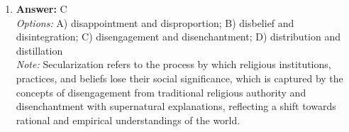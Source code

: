 \documentclass[12pt]{article}
\begin{document}
\begin{enumerate}[label=\arabic*.]
\\ \textit{Note:} The term 'power elite' as introduced by Scott (1991) accurately describes a small group of individuals within a state who hold significant power and influence, primarily originating from a dominant power bloc, thereby reinforcing the notion of concentrated authority in sociopolitical structures.
\item \textbf{Answer:} C
\\ \textit{Options:} A) disappointment and disproportion; B) disbelief and disintegration; C) disengagement and disenchantment; D) distribution and distillation
\\ \textit{Note:} Secularization refers to the process by which religious institutions, practices, and beliefs lose their social significance, which is captured by the concepts of disengagement from traditional religious authority and disenchantment with supernatural explanations, reflecting a shift towards rational and empirical understandings of the world.
\end{enumerate}
\end{document}
